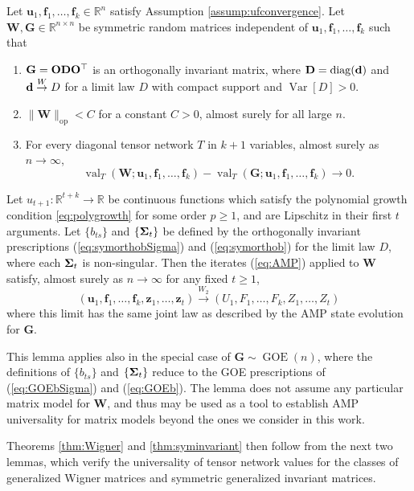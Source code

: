 \documentclass[10pt,reqno]{amsart}
\def\u{\mathbf{u}}
\def\z{\mathbf{z}}
\def\f{\mathbf{f}}
\def\W{\mathbf{W}}
\def\G{\mathbf{G}}
\def\R{\mathbb{R}}
\def\Var{\operatorname{Var}}
\def\diag{\operatorname{diag}}
\def\val{\operatorname{val}}
\def\op{\mathrm{op}}
\def\GOE{\operatorname{GOE}}
\def\toW{\overset{W}{\to}}
\def\toWtwo{\overset{W_2}{\to}}
\begin{document}
\begin{lemma}\label{lemma:Wignercompare}
Let $\u_1,\f_1,\ldots,\f_k \in \R^n$ satisfy Assumption
\ref{assump:ufconvergence}. Let $\W,\G \in \R^{n \times n}$ be symmetric
random matrices independent of $\u_1,\f_1,\ldots,\f_k$ such that
\begin{enumerate}
\item $\G=\Ob\Db\Ob^\top$ is an orthogonally invariant matrix, where
$\Db=\diag(\db)$ and $\db \toW D$ for a limit law $D$ with compact support and
$\Var[D]>0$.
\item $\|\W\|_\op<C$ for a constant $C>0$, almost surely for all large $n$.
\item For every diagonal tensor network $T$ in $k+1$ variables,
almost surely as $n \to \infty$,
\[\val_T(\W;\u_1,\f_1,\ldots,\f_k)-\val_T(\G;\u_1,\f_1,\ldots,\f_k) \to 0.\]
\end{enumerate}
Let $u_{t+1}:\R^{t+k} \to \R$ be continuous functions which satisfy the 
polynomial growth condition \eqref{eq:polygrowth} for some order $p \geq 1$,
and are Lipschitz in their first $t$ arguments. Let
$\{b_{ts}\}$ and $\{\bm{\Sigma}_t\}$ be defined by the orthogonally invariant
prescriptions (\ref{eq:symorthobSigma}) and (\ref{eq:symorthob}) for the limit
law $D$, where each $\bm{\Sigma}_t$ is non-singular. Then the iterates
(\ref{eq:AMP}) applied to $\W$ satisfy, almost surely as $n \to \infty$ for any
fixed $t \geq 1$,
\[(\u_1,\f_1,\ldots,\f_k,\z_1,\ldots,\z_t) \toWtwo
(U_1,F_1,\ldots,F_k,Z_1,\ldots,Z_t)\]
where this limit has the same joint law as described by the AMP state evolution
for $\G$.
\end{lemma}

This lemma applies also in the special case of $\G \sim \GOE(n)$,
where the definitions of $\{b_{ts}\}$ and $\{\bm{\Sigma}_t\}$ reduce to the GOE 
prescriptions of (\ref{eq:GOEbSigma}) and (\ref{eq:GOEb}).
The lemma does not assume any particular matrix model for $\W$, and thus
may be used as a tool to establish AMP universality for matrix
models beyond the ones we consider in this work.

Theorems \ref{thm:Wigner} and \ref{thm:syminvariant} then follow 
from the next two lemmas, which verify the universality of tensor network
values for the classes of generalized Wigner matrices and symmetric
generalized invariant matrices.
\end{document}
